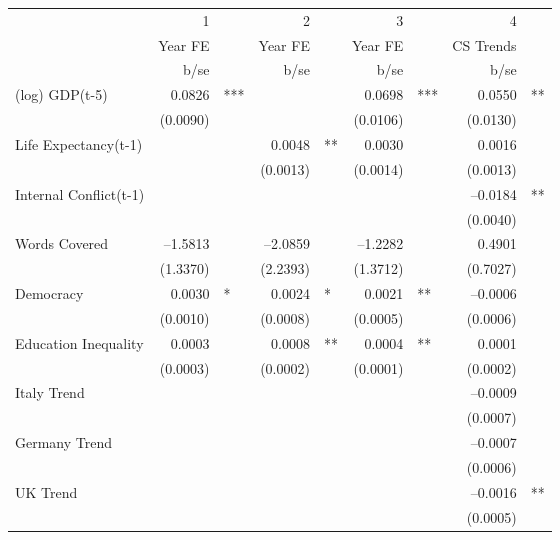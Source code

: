 \begin{tabular} {l* {4}{r @{} l}}
\hline
            &           1&   &           2&   &           3&   &           4&   \\
            &     Year FE&   &     Year FE&   &     Year FE&   &   CS Trends&   \\
            &        b/se&   &        b/se&   &        b/se&   &        b/se&   \\
\hline
(log) GDP(t-5)&      0.0826&***&            &   &      0.0698&***&      0.0550&** \\
            &    (0.0090)&   &            &   &    (0.0106)&   &    (0.0130)&   \\
Life Expectancy(t-1) &            &   &      0.0048&** &      0.0030&   &      0.0016&   \\
            &            &   &    (0.0013)&   &    (0.0014)&   &    (0.0013)&   \\
Internal Conflict(t-1)&            &   &            &   &            &   &    --0.0184&** \\
            &            &   &            &   &            &   &    (0.0040)&   \\
Words Covered&    --1.5813&   &    --2.0859&   &    --1.2282&   &      0.4901&   \\
            &    (1.3370)&   &    (2.2393)&   &    (1.3712)&   &    (0.7027)&   \\
Democracy   &      0.0030&*  &      0.0024&*  &      0.0021&** &    --0.0006&   \\
            &    (0.0010)&   &    (0.0008)&   &    (0.0005)&   &    (0.0006)&   \\
Education Inequality&      0.0003&   &      0.0008&** &      0.0004&** &      0.0001&   \\
            &    (0.0003)&   &    (0.0002)&   &    (0.0001)&   &    (0.0002)&   \\
Italy Trend &            &   &            &   &            &   &    --0.0009&   \\
            &            &   &            &   &            &   &    (0.0007)&   \\
Germany Trend&            &   &            &   &            &   &    --0.0007&   \\
            &            &   &            &   &            &   &    (0.0006)&   \\
UK Trend    &            &   &            &   &            &   &    --0.0016&** \\
            &            &   &            &   &            &   &    (0.0005)&   \\

\end{tabular}
